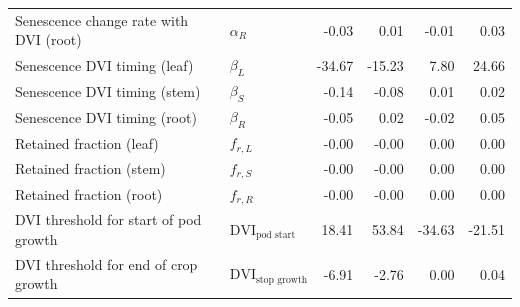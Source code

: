 \begin{tabular}{llrrrr}
  Senescence change rate with DVI (root) & $\alpha_{R}$ & -0.03 & 0.01 & -0.01 & 0.03 \\
  Senescence DVI timing (leaf) & $\beta_{L}$ & -34.67 & -15.23 & 7.80 & 24.66 \\
  Senescence DVI timing (stem) & $\beta_{S}$ & -0.14 & -0.08 & 0.01 & 0.02 \\
  Senescence DVI timing (root) & $\beta_{R}$ & -0.05 & 0.02 & -0.02 & 0.05 \\
  Retained fraction (leaf) & $f_{r,L}$ & -0.00 & -0.00 & 0.00 & 0.00 \\
  Retained fraction (stem) & $f_{r,S}$ & -0.00 & -0.00 & 0.00 & 0.00 \\
  Retained fraction (root) & $f_{r,R}$ & -0.00 & -0.00 & 0.00 & 0.00 \\
  DVI threshold for start of pod growth & $\text{DVI}_\text{pod start}$ & 18.41 & 53.84 & -34.63 & -21.51 \\
  DVI threshold for end of crop growth & $\text{DVI}_\text{stop growth}$ & -6.91 & -2.76 & 0.00 & 0.04 \\
  \bottomrule
\end{tabular}

